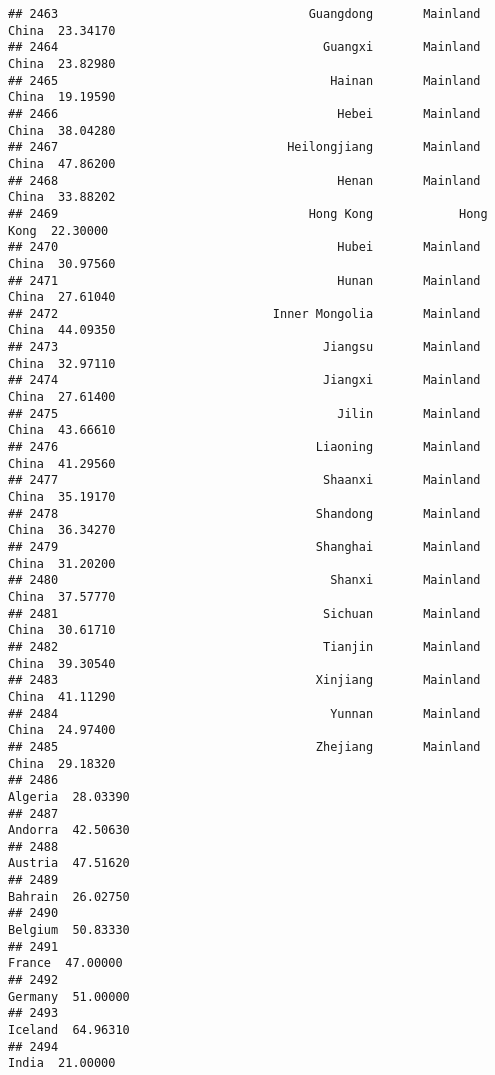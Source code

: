 \documentclass[
]{article}
\begin{document}
\begin{verbatim}
## 2463                                   Guangdong       Mainland China  23.34170
## 2464                                     Guangxi       Mainland China  23.82980
## 2465                                      Hainan       Mainland China  19.19590
## 2466                                       Hebei       Mainland China  38.04280
## 2467                                Heilongjiang       Mainland China  47.86200
## 2468                                       Henan       Mainland China  33.88202
## 2469                                   Hong Kong            Hong Kong  22.30000
## 2470                                       Hubei       Mainland China  30.97560
## 2471                                       Hunan       Mainland China  27.61040
## 2472                              Inner Mongolia       Mainland China  44.09350
## 2473                                     Jiangsu       Mainland China  32.97110
## 2474                                     Jiangxi       Mainland China  27.61400
## 2475                                       Jilin       Mainland China  43.66610
## 2476                                    Liaoning       Mainland China  41.29560
## 2477                                     Shaanxi       Mainland China  35.19170
## 2478                                    Shandong       Mainland China  36.34270
## 2479                                    Shanghai       Mainland China  31.20200
## 2480                                      Shanxi       Mainland China  37.57770
## 2481                                     Sichuan       Mainland China  30.61710
## 2482                                     Tianjin       Mainland China  39.30540
## 2483                                    Xinjiang       Mainland China  41.11290
## 2484                                      Yunnan       Mainland China  24.97400
## 2485                                    Zhejiang       Mainland China  29.18320
## 2486                                                          Algeria  28.03390
## 2487                                                          Andorra  42.50630
## 2488                                                          Austria  47.51620
## 2489                                                          Bahrain  26.02750
## 2490                                                          Belgium  50.83330
## 2491                                                           France  47.00000
## 2492                                                          Germany  51.00000
## 2493                                                          Iceland  64.96310
## 2494                                                            India  21.00000

\end{verbatim}
\end{document}
